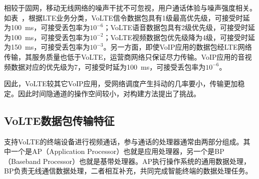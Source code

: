 
相较于固网，移动无线网络的噪声干扰不可忽视，用户通话体验与噪声强度相关。如表\ ，根据LTE业务分类，VoLTE信令数据包具有1级最高优先级，可接受时延为{100\ ms}，可接受丢包率为$10^{-6}$；VoLTE语音数据包具有2级优先级，可接受时延为{100\ ms}，可接受丢包率为$10^{-2}$；VoLTE视频数据包优先级降为4级，可接受时延为{150\ ms}，可接受丢包率为$10^{-3}$。另一方面，即使VoIP应用的数据包经LTE网络传输，其服务质量也低于VoLTE，运营商网络只保证尽力传输。VoIP应用的音视频数据对应的优先级为7，可接受时延为{100\ ms}，可接受丢包率为$10^{-6}$。

因此，VoLTE较其它VoIP应用，受网络调度产生抖动的几率要小，传输更加稳定。因此时间隐通道的操作空间较小，对构建方法提出了挑战。

\subsection{VoLTE数据包传输特征}
\label{chap:backinfo:volte:packets}
支持VoLTE的终端设备进行视频通话，参与通话的处理器通常由两部分组成。其中一个是AP（Application Processor）也就是应用处理器，另一个是BP（Baseband Processor）也就是基带处理器。AP执行操作系统的通用数据处理，BP负责无线通信数据处理，二者相互补充，共同完成智能终端的数据处理任务。

